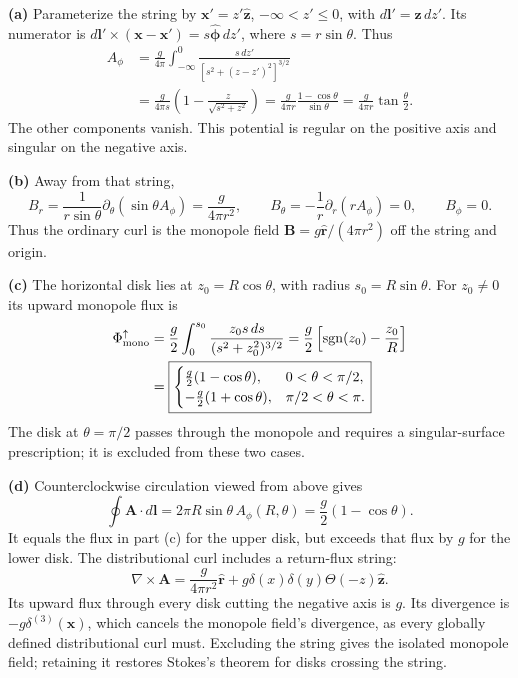 \textbf{(a)} Parameterize the string by $\mathbf x'=z'\hat{\mathbf z}$,
$-\infty<z'\le0$, with $d\mathbf l'=\hat{\mathbf z}\,dz'$. Its numerator
is $d\mathbf l'\times(\mathbf x-\mathbf x')=s\hat{\boldsymbol\phi}\,dz'$,
where $s=r\sin\theta$. Thus
\begin{align*}
A_\phi&=\frac g{4\pi}\int_{-\infty}^0
\frac{s\,dz'}{[s^2+(z-z')^2]^{3/2}}\\
&=\frac g{4\pi s}\left(1-\frac z{\sqrt{s^2+z^2}}\right)
=\boxed{\frac g{4\pi r}\frac{1-\cos\theta}{\sin\theta}
=\frac g{4\pi r}\tan\frac\theta2}.
\end{align*}
The other components vanish. This potential is regular on the positive
axis and singular on the negative axis.

\textbf{(b)} Away from that string,
\[
B_r=\frac1{r\sin\theta}\partial_\theta(\sin\theta A_\phi)
=\frac g{4\pi r^2},\qquad
B_\theta=-\frac1r\partial_r(rA_\phi)=0,\qquad B_\phi=0.
\]
Thus the ordinary curl is the monopole field
$\boxed{\mathbf B=g\hat{\mathbf r}/(4\pi r^2)}$ off the string and origin.

\textbf{(c)} The horizontal disk lies at $z_0=R\cos\theta$, with radius
$s_0=R\sin\theta$. For $z_0\ne0$ its upward monopole flux is
\begin{align*}
\Phi_{\rm mono}^{\uparrow}
&=\frac g2\int_0^{s_0}\frac{z_0s\,ds}{(s^2+z_0^2)^{3/2}}
=\frac g2\left[\operatorname{sgn}(z_0)-\frac{z_0}{R}\right]\\
&=\boxed{\begin{cases}
\frac g2(1-\cos\theta),&0<\theta<\pi/2,\\
-\frac g2(1+\cos\theta),&\pi/2<\theta<\pi.
\end{cases}}
\end{align*}
The disk at $\theta=\pi/2$ passes through the monopole and requires a
singular-surface prescription; it is excluded from these two cases.

\textbf{(d)} Counterclockwise circulation viewed from above gives
\[
\oint\mathbf A\cdot d\mathbf l=2\pi R\sin\theta\,A_\phi(R,\theta)
=\boxed{\frac g2(1-\cos\theta)}.
\]
It equals the flux in part (c) for the upper disk, but exceeds that flux
by $g$ for the lower disk. The distributional curl includes a return-flux
string:
\[
\nabla\times\mathbf A=\frac g{4\pi r^2}\hat{\mathbf r}
+g\delta(x)\delta(y)\Theta(-z)\hat{\mathbf z}.
\]
Its upward flux through every disk cutting the negative axis is $g$.
Its divergence is $-g\delta^{(3)}(\mathbf x)$, which cancels the monopole
field's divergence, as every globally defined distributional curl must.
Excluding the string gives the isolated monopole field; retaining it
restores Stokes's theorem for disks crossing the string.

